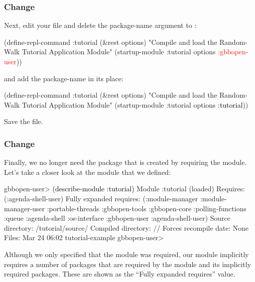 \documentclass[10pt,twoside,english,pdftex]{article}
\begin{document}
\subsubsection*{Change }
%
Next, edit your  file and delete the
 package-name argument to
:
%
\W\supp
\begin{example}
\textcolor{darkergray}{%
  (define-repl-command :tutorial (\&rest options)
    "Compile and load the Random-Walk Tutorial Application Module"
    (startup-module :tutorial options \textcolor{red}{:gbbopen-user}))}
\end{example}
%
and add the package-name  in its place:
%
\W\supp\notpretop
\begin{example}
\textcolor{darkergray}{%
  (define-repl-command :tutorial (\&rest options)
    "Compile and load the Random-Walk Tutorial Application Module"
    (startup-module :tutorial options \textcolor{black}{:tutorial}))}
\end{example}
%
Save the file.

\subsubsection*{Change }

%
%
Finally, we no longer need the  package that is
created by requiring the  module.  Let's take
a closer look at the  module that we defined:
%
\W\supp
\begin{example}
\textcolor{darkergray}{%
  gbbopen-user> \textcolor{black}{(describe-module :tutorial)}
  Module :tutorial (loaded)
    Requires: (:agenda-shell-user)
    Fully expanded requires: (:module-manager :module-manager-user :portable-threads
                              :gbbopen-tools :gbbopen-core :polling-functions
                              :queue :agenda-shell :os-interface :gbbopen-user
                              :agenda-shell-user)
    Source directory: /tutorial/source/
    Compiled directory: //
    Forces recompile date: None
    Files:   Mar 24 06:02  tutorial-example
  gbbopen-user>}
\end{example}
%
Although we only specified that the  module
was required, our  module implicitly requires a number of
packages that are required by the  module and
its implicitly required packages.  These are shown as the ``Fully expanded
requires'' value.
\end{document}
